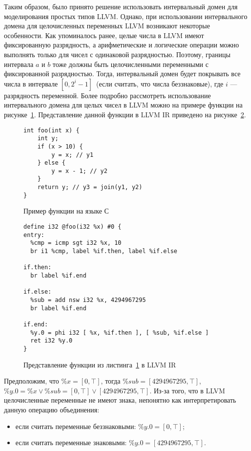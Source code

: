 Таким образом, было принято решение использовать интервальный домен для 
моделирования простых типов LLVM. Однако, при использовании интервального 
домена для целочисленных переменных LLVM возникают некоторые особенности. Как 
упоминалось ранее, целые числа в LLVM имеют фиксированную разрядность, а 
арифметические и логические операции можно выполнять только для чисел с 
одинаковой разрядностью. Поэтому, границы интервала $a$ и $b$ тоже должны быть 
целочисленными переменными с фиксированной разрядностью. Тогда, интервальный 
домен будет покрывать все числа в интервале $[0, 2^i - 1]$~(если считать, что 
числа беззнаковые), где $i$ --- разрядность переменной. Более подробно 
рассмотреть использование интервального домена для целых чисел в LLVM можно на 
примере функции на рисунке~\ref{lst:funcC}. Представление данной функции в 
LLVM IR приведено на рисунке~\ref{lst:funcLLVM}.

\begin{figure}[h!]
\begin{lstlisting}[style=c]
int foo(int x) {
    int y;
    if (x > 10) {
        y = x; // y1
    } else {
        y = x - 1; // y2
    }
    return y; // y3 = join(y1, y2)
}
\end{lstlisting}
\caption{Пример функции на языке С}
\label{lst:funcC}
\end{figure}

\begin{figure}[h!]
\begin{lstlisting}[style=llvm]
define i32 @foo(i32 %x) #0 {
entry:
  %cmp = icmp sgt i32 %x, 10
  br i1 %cmp, label %if.then, label %if.else

if.then:
  br label %if.end

if.else:
  %sub = add nsw i32 %x, 4294967295
  br label %if.end

if.end:
  %y.0 = phi i32 [ %x, %if.then ], [ %sub, %if.else ]
  ret i32 %y.0
}
\end{lstlisting}
\caption{Представление функции из листинга~\ref{lst:funcC} в LLVM IR}
\label{lst:funcLLVM}
\end{figure}

Предположим, что $\%x = [0, \top]$, тогда $\%sub = [4294967295, \top]$, $\%y.0 = 
\%x \vee \%sub = [0, \top] \vee [4294967295, \top]$. Из-за того, что в LLVM 
целочисленные переменные не имеют знака, непонятно как интерпретировать данную
операцию объединения:
\begin{itemize}
\item если считать переменные беззнаковыми: $\%y.0 = [0, \top]$;
\item если считать переменные знаковыми: $\%y.0 = [4294967295, \top]$.
\end{itemize}

